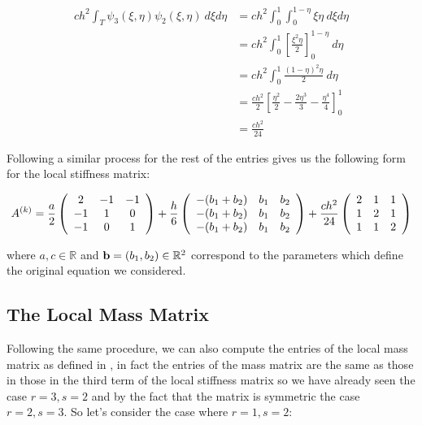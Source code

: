\begin{align*}
    ch^2\int_T\psi_3(\xi,\eta)\psi_2(\xi,\eta)\ d\xi d\eta
    &= ch^2\int_0^1\int_0^{1-\eta}\xi\eta\ d\xi d\eta \\
    &= ch^2\int_0^1\left[\frac{\xi^2\eta}{2}\right]_0^{1-\eta}\ d\eta \\
    &= ch^2\int_0^1\frac{(1-\eta)^2\eta}{2}\ d\eta \\
    &= \frac{ch^2}{2}\left[\frac{\eta^2}{2} - \frac{2\eta^3}{3} - \frac{\eta^4}{4}\right]_0^1 \\
    &= \frac{ch^2}{24}
\end{align*}

Following a similar process for the rest of the entries gives us the following
form for the local stiffness matrix:

\begin{equation}\label{eq:twod-local-stiffness}
 A^{(k)} =
    \frac{a}{2}\left(\begin{array}{c c c}
         2 & -1 & -1 \\
        -1 &  1 &  0 \\
        -1 &  0 &  1
    \end{array}\right)
    + \frac{h}{6} \left(\begin{array}{c c c}
        -(b_1 + b_2) & b_1  & b_2 \\
        -(b_1 + b_2) & b_1  & b_2 \\
        -(b_1 + b_2) & b_1  & b_2
    \end{array}\right)
    + \frac{ch^2}{24}\left(\begin{array}{c c c}
         2 &  1 &  1 \\
         1 &  2 &  1 \\
         1 &  1 &  2
      \end{array}\right)
\end{equation}

where $a, c \in \mathbb{R}$ and $\mathbf{b} = (b_1, b_2) \in \mathbb{R}^2$
correspond to the parameters which define the original equation
 we considered.

\subsection{The Local Mass Matrix}\label{sec:twod-deterministic-local-mass}

Following the same procedure, we can also compute the entries of the local mass
matrix as defined in , in fact the
entries of the mass matrix are the same as those in those in the third term of
the local stiffness matrix so we have already seen the case $r = 3, s = 2$ and
by the fact that the matrix is symmetric the case $r = 2, s = 3$. So let's
consider the case where $r = 1, s = 2$:

